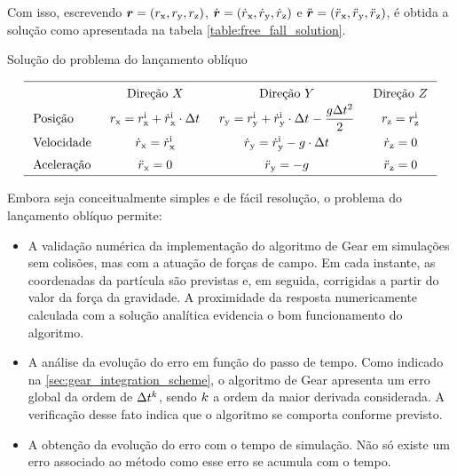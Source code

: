 Com isso, escrevendo \(\position = \explicitVectorCoordinates{\positionScalar}\), \(\velocity = \explicitVectorCoordinates{\velocityScalar}\) e \(\acceleration = \explicitVectorCoordinates{\accelerationScalar}\), é obtida a solução como apresentada na tabela \ref{table:free_fall_solution}.

\begin{table}[h]
	\caption{Solução do problema do lançamento oblíquo}
	\label{table:free_fall_solution}

	\begin{equation*}
		\arraycolsep=1.5\arraycolsep
		\def\arraystretch{1.5}
		\begin{array}{lccc}
	\hline
		& \text{Direção } \xAxis 
		& \text{Direção } \yAxis 
		& \text{Direção } \zAxis
		\\
	\text{Posição} 
		& \positionx = \initial{\positionx} + \initial{\velocityx}\cdot \Dt
		& \positiony = \initial{\positiony} + \initial{\velocityy}\cdot \Dt - \dfrac{\gravityScalar\Dt^2}{2}
		& \positionz = \initial{\positionz} \\
	\text{Velocidade} 
		& \velocityx = \initial{\velocityx}
		& \velocityy = \initial{\velocityy} - \gravityScalar\cdot \Dt
		& \velocityz = 0 \\
	\text{Aceleração} 
		& \accelerationx = 0
		& \accelerationy = - \gravityScalar
		& \accelerationz = 0 \\
	\hline	
		\end{array}
	\end{equation*}
	\sourceMe
\end{table}

Embora seja conceitualmente simples e de fácil resolução, o problema do lançamento oblíquo permite:
\begin{itemize}
\item A validação numérica da implementação do algoritmo de Gear em simulações sem colisões, mas com a atuação de forças de campo. Em cada instante, as coordenadas da partícula são previstas e, em seguida, corrigidas a partir do valor da força da gravidade. A proximidade da resposta numericamente calculada com a solução analítica evidencia o bom funcionamento do algoritmo.
\item A análise da evolução do erro em função do passo de tempo. Como indicado na \autoref{sec:gear_integration_scheme}, o algoritmo de Gear apresenta um erro global da ordem de \(\Delta t_{}^k\), sendo \(k\) a ordem da maior derivada considerada. A verificação desse fato indica que o algoritmo se comporta conforme previsto.
\item A obtenção da evolução do erro com o tempo de simulação. Não só existe um erro associado ao método como esse erro se acumula com o tempo.
\end{itemize}

